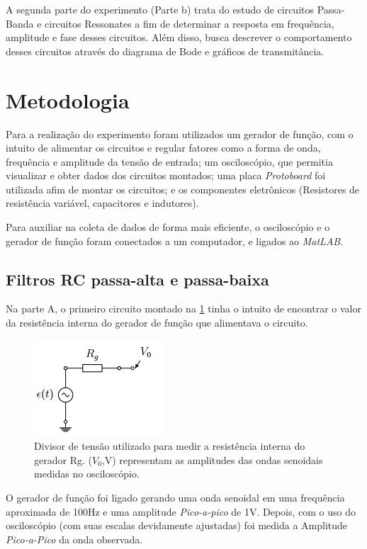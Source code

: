 \documentclass[11pt,a4paper]{article}
\begin{document}
A segunda parte do experimento (Parte b) trata do estudo de circuitos Passa-Banda e circuitos Ressonates a fim de determinar a resposta em frequência, amplitude e fase desses circuitos. Além disso, busca descrever o comportamento desses circuitos através do diagrama de Bode e gráficos de transmitância.

\section{Metodologia}
Para a realização do experimento foram utilizados um gerador de função, com o intuito de alimentar os circuitos e regular fatores como a forma de onda, frequência e amplitude da tensão de entrada; um osciloscópio, que permitia visualizar e obter dados dos circuitos montados; uma placa \textit{Protoboard} foi utilizada afim de montar os circuitos; e os componentes eletrônicos (Resistores de resistência variável, capacitores e indutores).

Para auxiliar na coleta de dados de forma mais eficiente, o osciloscópio e o  gerador de função foram conectados a um computador, e ligados ao \textit{MatLAB}.

\subsection{Filtros RC passa-alta e passa-baixa}
Na parte A, o primeiro circuito montado na \cref{Circuito1a} tinha o intuito de encontrar o valor da resistência interna do gerador de função que alimentava o circuito. 

    \begin{figure}[!htb]
    \centering
    \includegraphics[scale=0.7]{Circuito1-a.png}
    \caption{Divisor de tensão utilizado para medir a resistência interna do gerador Rg.
    ($V_0 $,V) representam as amplitudes das ondas senoidais medidas no osciloscópio.}
    \label{Circuito1a}
    \end{figure}

O gerador de função foi ligado gerando uma onda senoidal em uma frequência aproximada de 100Hz e uma amplitude \textit{Pico-a-pico} de 1V. Depois, com o uso do osciloscópio (com suas escalas devidamente ajustadas) foi medida a Amplitude \textit{Pico-a-Pico} da onda observada.
\end{document}
